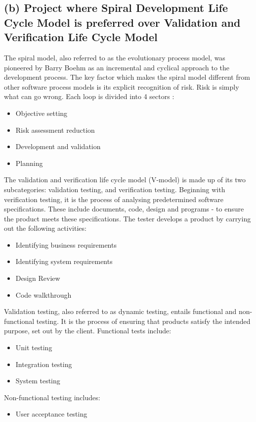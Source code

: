 \documentclass{article}
\begin{document}
\subsection{(b) Project where Spiral Development Life Cycle Model is preferred over Validation and Verification Life Cycle Model}
\begin{flushleft}
	The spiral model, also referred to as the evolutionary process model, was pioneered by Barry Boehm as an incremental and cyclical approach to the development process. The key factor which makes the spiral model different from other software process models is its explicit recognition of risk. Risk is simply what can go wrong.  Each loop is divided into 4 sectors \cite{sommerville2016software}:
\begin{itemize}
	\item Objective setting
	\item Risk assessment reduction
	\item Development and validation
	\item Planning 
\end{itemize} 
	The validation and verification life cycle model (V-model) is made up of its two subcategories: validation testing, and verification testing. Beginning with verification testing, it is the process of analysing predetermined software specifications. These include documents, code, design and programs - to ensure the product meets these specifications. The tester develops a product by carrying out the following activities:
\begin{itemize}
	\item Identifying business requirements
	\item Identifying system requirements
	\item Design Review
	\item Code walkthrough
\end{itemize}
	Validation testing, also referred to as dynamic testing, entails functional and non-functional testing. It is the process of ensuring that products satisfy the intended purpose, set out by the client. Functional tests include:
\begin{itemize}
	\item Unit testing
	\item Integration testing
	\item System testing
\end{itemize}
Non-functional testing includes:
\begin{itemize}
	\item User acceptance testing

\end{itemize}
\end{flushleft}
\end{document}
